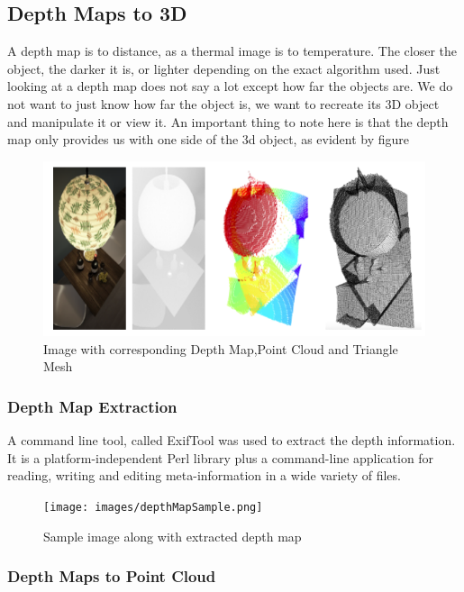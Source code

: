 \documentclass{article}
\begin{document}
    \subsection{Depth Maps to 3D}
    
    A depth map is to distance, as a thermal image is to temperature. The closer the object, the darker it is, or lighter depending on the exact algorithm used. Just looking at a depth map does not say a lot except how far the objects are. We do not want to just know how far the object is, we want to recreate its 3D object and manipulate it or view it. An important thing to note here is that the depth map only provides us with one side of the 3d object, as evident by figure 

    \begin{figure}[H]
        \centering
        \includegraphics[width=15cm]{images/imageDMPC.png}
        \caption{Image with corresponding Depth Map,Point Cloud and Triangle Mesh}
        
    \end{figure}

    
    \subsubsection{Depth Map Extraction}
    
    A command line tool, called ExifTool was used to extract the depth information. It is a platform-independent Perl library plus a command-line application for reading, writing and editing meta-information in a wide variety of files. 
    \begin{figure}[H]
        \centering
        \texttt{[image: images/depthMapSample.png]}
        \caption{Sample image along with extracted depth map}
    
    \end{figure}
    
    
    \subsubsection{Depth Maps to Point Cloud}
    
\end{document}

